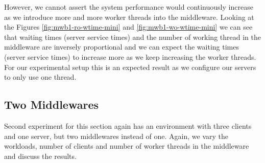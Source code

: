 \documentclass[11pt,a4paper]{article}
\begin{document}
\par However, we cannot assert the system performance would continuously increase as we introduce more and more worker threads into the middleware. Looking at the Figures \ref{fig:mwb1-ro-wtime-mini} and \ref{fig:mwb1-wo-wtime-mini} we can see that waiting times (server service times) and the number of working thread in the middleware are inversely proportional and we can expect the waiting times (server service times) to increase more as we keep increasing the worker threads. For our experimental setup this is an expected result as we configure our servers to only use one thread. 

\subsection{Two Middlewares} \label{sec:mwb2}
Second experiment for this section again has an environment with three clients and one server, but two middlewares instead of one. Again, we vary the workloads, number of clients and number of worker threads in the middleware and discuss the results.
\end{document}
